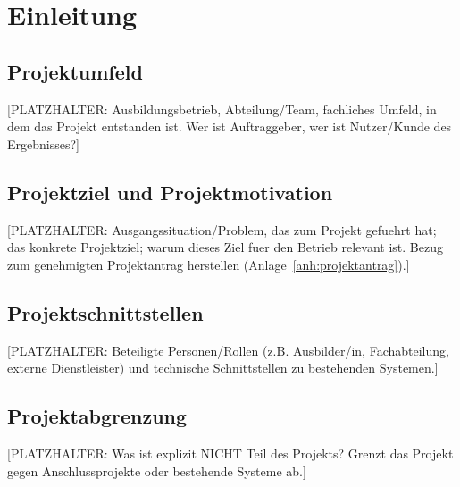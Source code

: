 \chapter{Einleitung}
\label{ch:einleitung}


\section{Projektumfeld}
[PLATZHALTER: Ausbildungsbetrieb, Abteilung/Team, fachliches Umfeld, in dem
das Projekt entstanden ist. Wer ist Auftraggeber, wer ist Nutzer/Kunde des
Ergebnisses?]

\section{Projektziel und Projektmotivation}
\label{sec:projektziel}
[PLATZHALTER: Ausgangssituation/Problem, das zum Projekt gefuehrt hat; das
konkrete Projektziel; warum dieses Ziel fuer den Betrieb relevant ist. Bezug
zum genehmigten Projektantrag herstellen (Anlage~\ref{anh:projektantrag}).]

\section{Projektschnittstellen}
[PLATZHALTER: Beteiligte Personen/Rollen (z.B. Ausbilder/in, Fachabteilung,
externe Dienstleister) und technische Schnittstellen zu bestehenden Systemen.]

\section{Projektabgrenzung}
[PLATZHALTER: Was ist explizit NICHT Teil des Projekts? Grenzt das Projekt
gegen Anschlussprojekte oder bestehende Systeme ab.]

